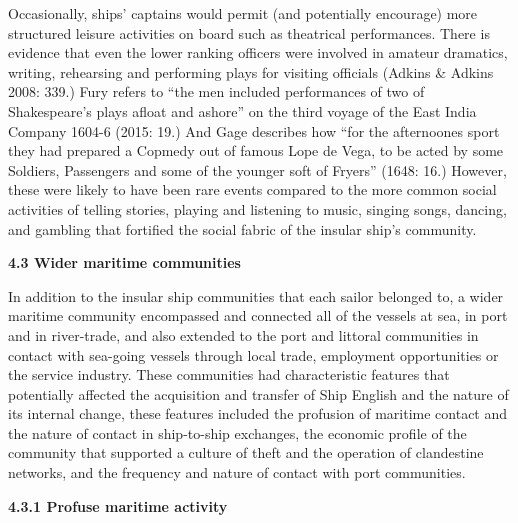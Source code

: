 \begin{styleStandard}
Occasionally, ships’ captains would permit (and potentially encourage) more structured leisure activities on board such as theatrical performances. There is evidence that even the lower ranking officers were involved in amateur dramatics, writing, rehearsing and performing plays for visiting officials (Adkins \& Adkins 2008: 339.) Fury refers to “the men included performances of two of Shakespeare’s plays afloat and ashore” on the third voyage of the East India Company 1604-6 (2015: 19.) And Gage describes how “for the afternoones sport they had prepared a Copmedy out of famous Lope de Vega, to be acted by some Soldiers, Passengers and some of the younger soft of Fryers” (1648: 16.) However, these were likely to have been rare events compared to the more common social activities of telling stories, playing and listening to music, singing songs, dancing, and gambling that fortified the social fabric of the insular ship’s community. 
\end{styleStandard}

\begin{styleStandard}
\textbf{4.3 Wider maritime communities}
\end{styleStandard}

\begin{styleStandard}
In addition to the insular ship communities that each sailor belonged to, a wider maritime community encompassed and connected all of the vessels at sea, in port and in river-trade, and also extended to the port and littoral communities in contact with sea-going vessels through local trade, employment opportunities or the service industry. These communities had characteristic features that potentially affected the acquisition and transfer of Ship English and the nature of its internal change, these features included the profusion of maritime contact and the nature of contact in ship-to-ship exchanges, the economic profile of the community that supported a culture of theft and the operation of clandestine networks, and the frequency and nature of contact with port communities. 
\end{styleStandard}

\begin{styleStandard}
\textbf{4.3.1 Profuse maritime activity}
\end{styleStandard}

